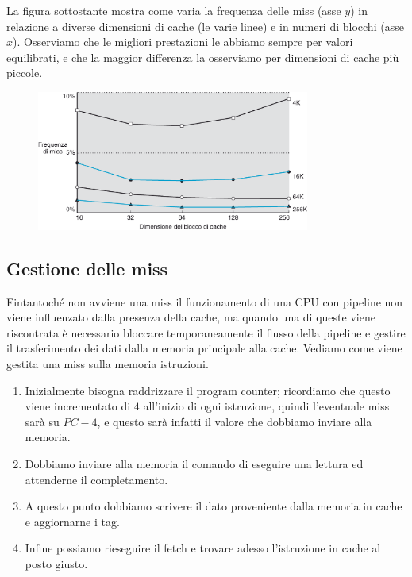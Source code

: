 \documentclass[class=book, crop=false, oneside]{standalone}
\begin{document}
La figura sottostante mostra come varia la frequenza delle miss (asse \(y\)) in relazione a diverse dimensioni di cache (le varie linee) e in numeri di blocchi (asse \(x\)). Osserviamo che le migliori prestazioni le abbiamo sempre per valori equilibrati, e che la maggior differenza la osserviamo per dimensioni di cache più piccole.
\begin{figure}[H]
  \centering
  \includegraphics[width=0.8\textwidth,keepaspectratio]{missfreq.png}
\end{figure}

\subsection{Gestione delle miss}
Fintantoché non avviene una miss il funzionamento di una CPU con pipeline non viene influenzato dalla presenza della cache, ma quando una di queste viene riscontrata è necessario bloccare temporaneamente il flusso della pipeline e gestire il trasferimento dei dati dalla memoria principale alla cache. Vediamo come viene gestita una miss sulla memoria istruzioni.
\begin{enumerate}
  \item Inizialmente bisogna raddrizzare il program counter; ricordiamo che questo viene incrementato di \(4\) all'inizio di ogni istruzione, quindi l'eventuale miss sarà su \(PC-4\), e questo sarà infatti il valore che dobbiamo inviare alla memoria.
  \item Dobbiamo inviare alla memoria il comando di eseguire una lettura ed attenderne il completamento.
  \item A questo punto dobbiamo scrivere il dato proveniente dalla memoria in cache e aggiornarne i tag.
  \item Infine possiamo rieseguire il fetch e trovare adesso l'istruzione in cache al posto giusto.
\end{enumerate}
\end{document}
